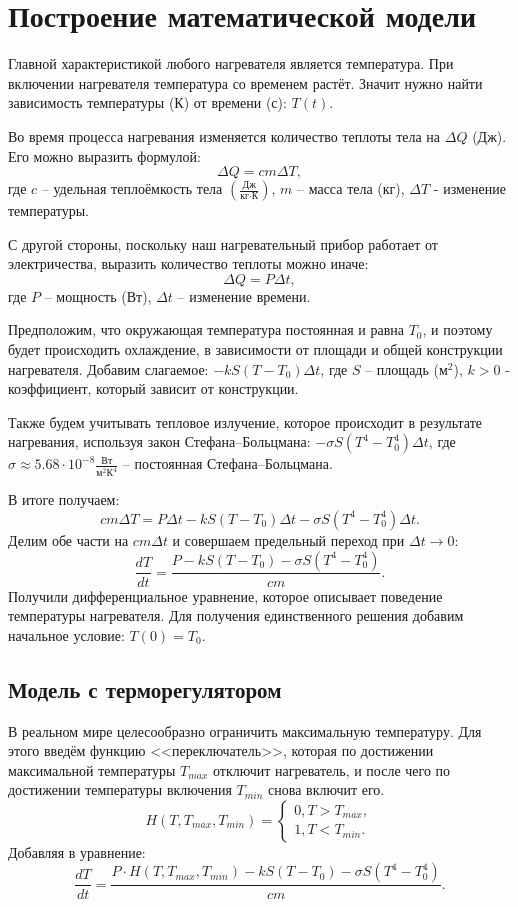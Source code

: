 \section{Построение математической модели}
    Главной характеристикой любого нагревателя является температура. При включении нагревателя температура со временем растёт. Значит нужно найти зависимость температуры (К) от времени (с): $ T(t) $.

    Во время процесса нагревания изменяется количество теплоты тела на $ \Delta Q $ (Дж). Его можно выразить формулой:
    \[
        \Delta Q = cm \Delta T,
    \]
    где $c$ -- удельная теплоёмкость тела $\left(\frac{\text{Дж}}{\text{кг} \cdot \text{К}}\right)$, $m$ -- масса тела (кг), $ \Delta T $ - изменение температуры.

    С другой стороны, поскольку наш нагревательный прибор работает от электричества, выразить количество теплоты можно иначе:
    \[
        \Delta Q = P \Delta t,
    \]
    где $P$ -- мощность (Вт), $\Delta t$ -- изменение времени. 

    Предположим, что окружающая температура постоянная и равна $T_0$, и поэтому будет происходить охлаждение, в зависимости от площади и общей конструкции нагревателя. Добавим слагаемое: $ -k S (T - T_0) \Delta t $, где $S$ -- площадь ($\text{м}^2$), $k > 0$ - коэффициент, который зависит от конструкции.

    Также будем учитывать тепловое излучение, которое происходит в результате нагревания, используя закон Стефана--Больцмана: $ -\sigma S (T^4 - T_0^4) \Delta t $, где $\sigma \approx 5.68 \cdot 10^{-8} \frac{\text{Вт}}{\text{м}^2 \text{К}^4}$ -- постоянная Стефана--Больцмана.

    В итоге получаем:
    \[
        cm\Delta T = P \Delta t - k S (T - T_0) \Delta t - \sigma S (T^4 - T_0^4) \Delta t.
    \]
    Делим обе части на $ cm \Delta t $ и совершаем предельный переход при $ \Delta t \to 0 $:
    \[
        \frac{dT}{dt} = \frac{ P - k S (T - T_0) - \sigma S (T^4 - T_0^4) }{cm}.
    \]
    Получили дифференциальное уравнение, которое описывает поведение температуры нагревателя. Для получения единственного решения добавим начальное условие: \( T(0) = T_0 \).

    \subsection{Модель с терморегулятором}
    В реальном мире целесообразно ограничить максимальную температуру. Для этого введём функцию <<переключатель>>, которая по достижении максимальной температуры $ T_{max} $ отключит нагреватель, и после чего по достижении температуры включения $ T_{min} $ снова включит его.
    \[
        H(T, T_{max}, T_{min}) = \begin{cases}
            0, T > T_{max},\\
            1, T < T_{min}.
        \end{cases}
    \]
    Добавляя в уравнение:
    \[
        \frac{dT}{dt} = \frac{ P \cdot H(T, T_{max}, T_{min}) - k S (T - T_0) - \sigma S (T^4 - T_0^4) }{cm}.
    \]
